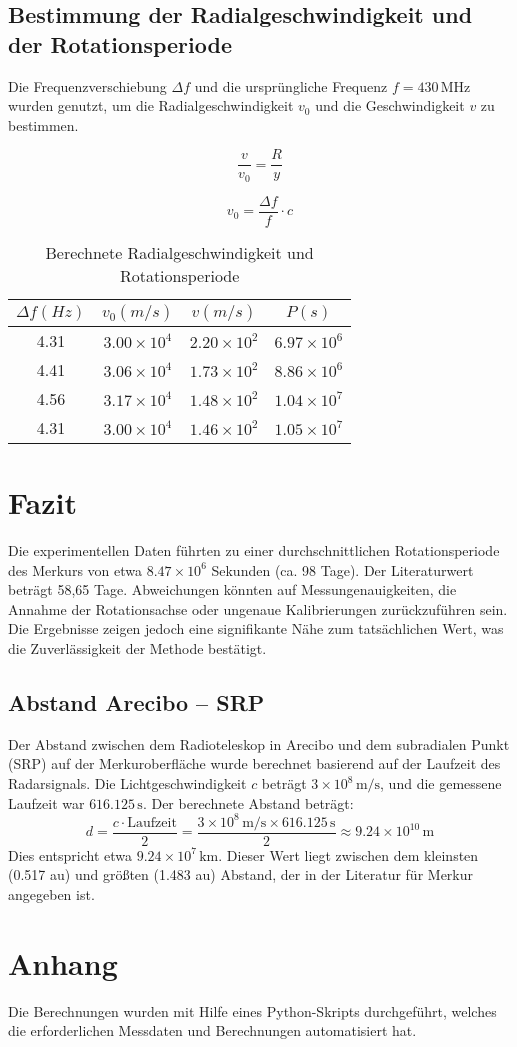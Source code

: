 \documentclass[a4paper,12pt]{article}
\begin{document}
\subsection*{Bestimmung der Radialgeschwindigkeit und der Rotationsperiode}
Die Frequenzverschiebung \(\Delta f\) und die ursprüngliche Frequenz \(f = 430 \, \text{MHz}\) wurden genutzt, um die Radialgeschwindigkeit \(v_0\) und die Geschwindigkeit \(v\) zu bestimmen.

\[
\frac{v}{v_0} = \frac{R}{y}
\]

\[
v_0 = \frac{\Delta f}{f} \cdot c
\]

\begin{table}[H]
    \centering
    \begin{tabular}{cccc}
        \toprule
        \(\Delta f (Hz)\) & \(v_0 (m/s)\) & \(v (m/s)\) & \(P (s)\) \\
        \midrule
        4.31 & \(3.00 \times 10^4\) & \(2.20 \times 10^2\) & \(6.97 \times 10^6\) \\
        4.41 & \(3.06 \times 10^4\) & \(1.73 \times 10^2\) & \(8.86 \times 10^6\) \\
        4.56 & \(3.17 \times 10^4\) & \(1.48 \times 10^2\) & \(1.04 \times 10^7\) \\
        4.31 & \(3.00 \times 10^4\) & \(1.46 \times 10^2\) & \(1.05 \times 10^7\) \\
        \bottomrule
    \end{tabular}
    \caption{Berechnete Radialgeschwindigkeit und Rotationsperiode}
\end{table}

\section*{Fazit}
Die experimentellen Daten führten zu einer durchschnittlichen Rotationsperiode des Merkurs von etwa \( 8.47 \times 10^6 \) Sekunden (ca. 98 Tage). Der Literaturwert beträgt 58,65 Tage. Abweichungen könnten auf Messungenauigkeiten, die Annahme der Rotationsachse oder ungenaue Kalibrierungen zurückzuführen sein. Die Ergebnisse zeigen jedoch eine signifikante Nähe zum tatsächlichen Wert, was die Zuverlässigkeit der Methode bestätigt.
\subsection*{Abstand Arecibo – SRP}

Der Abstand zwischen dem Radioteleskop in Arecibo und dem subradialen Punkt (SRP) auf der Merkuroberfläche wurde berechnet basierend auf der Laufzeit des Radarsignals. Die Lichtgeschwindigkeit \(c\) beträgt \(3 \times 10^8 \, \text{m/s}\), und die gemessene Laufzeit war \(616.125 \, \text{s}\). Der berechnete Abstand beträgt:
\[
d = \frac{c \cdot \text{Laufzeit}}{2} = \frac{3 \times 10^8 \, \text{m/s} \times 616.125 \, \text{s}}{2} \approx 9.24 \times 10^{10} \, \text{m}
\]
Dies entspricht etwa \(9.24 \times 10^7 \, \text{km}\). Dieser Wert liegt zwischen dem kleinsten (0.517 au) und größten (1.483 au) Abstand, der in der Literatur für Merkur angegeben ist.


\section*{Anhang}
Die Berechnungen wurden mit Hilfe eines Python-Skripts durchgeführt, welches die erforderlichen Messdaten und Berechnungen automatisiert hat.
\end{document}
